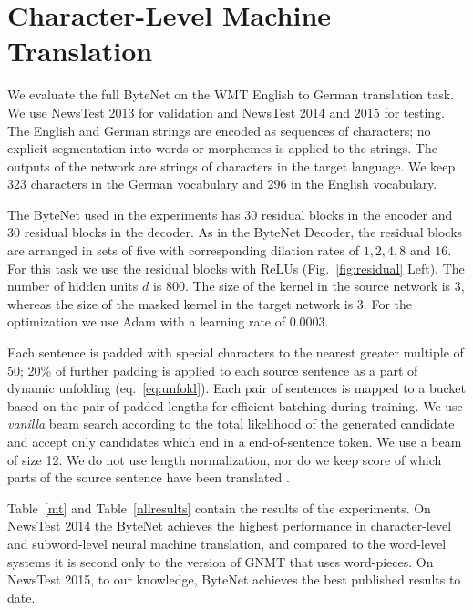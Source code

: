 \documentclass{article}
\newcommand{\figref}[1]{Fig.~\ref{#1}}
\begin{document}
\section{Character-Level Machine Translation}

We evaluate the full ByteNet on the WMT English to German translation task. We use NewsTest 2013 for validation and NewsTest 2014 and 2015 for testing. The English and German strings are encoded as sequences of characters; no explicit segmentation into words or morphemes is applied to the strings. The outputs of the network are strings of characters in the target language. We keep 323 characters in the German vocabulary and 296 in the English vocabulary.


The ByteNet used in the experiments has 30 residual blocks in the encoder and 30 residual blocks in the decoder. As in the ByteNet Decoder, the residual blocks are arranged in sets of five with corresponding dilation rates of $1,2,4,8$ and $16$. For this task we use the residual blocks with ReLUs (\figref{fig:residual} Left). The number of hidden units $d$ is 800. The size of the kernel in the source network is $3$, whereas the size of the masked kernel in the target network is $3$. For the optimization we use Adam with a learning rate of $0.0003$.

Each sentence is padded with special characters to the nearest greater multiple of 50; 20\% of further padding is applied to each source sentence as a part of dynamic unfolding (eq.~\ref{eq:unfold}). Each pair of sentences is mapped to a bucket based on the pair of padded lengths for efficient batching during training. We use \emph{vanilla} beam search according to the total likelihood of the generated candidate and accept only candidates which end in a end-of-sentence token. We use a beam of size 12. We do  not use length normalization, nor do we keep score of which parts of the source sentence have been translated \citep{wu2016}.

Table~\ref{mt} and Table~\ref{nllresults} contain the results of the experiments. On NewsTest 2014 the ByteNet achieves the highest performance in character-level and subword-level neural machine translation, and compared to the word-level systems it is second only to the version of GNMT that uses word-pieces. On NewsTest 2015, to our knowledge, ByteNet achieves the best published results to date.
\end{document}
